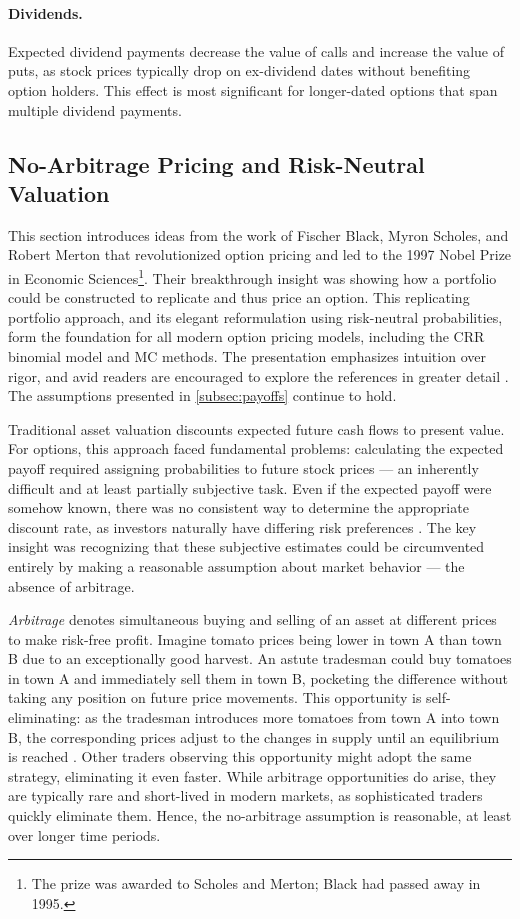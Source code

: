 \documentclass[english,12pt,a4paper,pdftex,sci,utf8]{aaltothesis}
\begin{document}
\paragraph{Dividends.} Expected dividend payments decrease the value of calls and increase the value of puts, as stock prices typically drop on ex-dividend dates without benefiting option holders. This effect is most significant for longer-dated options that span multiple dividend payments.
\clearpage


\subsection{No-Arbitrage Pricing and Risk-Neutral Valuation}\label{sec:risk-neutral-theory}

This section introduces ideas from the work of Fischer Black, Myron Scholes, and Robert Merton that revolutionized option pricing and led to the 1997 Nobel Prize in Economic Sciences\footnote{The prize was awarded to Scholes and Merton; Black had passed away in 1995.}. Their breakthrough insight was showing how a portfolio could be constructed to replicate and thus price an option. This replicating portfolio approach, and its elegant reformulation using risk-neutral probabilities, form the foundation for all modern option pricing models, including the CRR binomial model and MC methods. The presentation emphasizes intuition over rigor, and avid readers are encouraged to explore the references in greater detail \cite{hull2016options, gisiger2010risk, tham2001risk}. The assumptions presented in \cref{subsec:payoffs} continue to hold.

Traditional asset valuation discounts expected future cash flows to present value. For options, this approach faced fundamental problems: calculating the expected payoff required assigning probabilities to future stock prices --- an inherently difficult and at least partially subjective task. Even if the expected payoff were somehow known, there was no consistent way to determine the appropriate discount rate, as investors naturally have differing risk preferences \cite{nobel1997}. The key insight was recognizing that these subjective estimates could be circumvented entirely by making a reasonable assumption about market behavior --- the absence of arbitrage.

\emph{Arbitrage} denotes simultaneous buying and selling of an asset at different prices to make risk-free profit. Imagine tomato prices being lower in town A than town B due to an exceptionally good harvest. An astute tradesman could buy tomatoes in town A and immediately sell them in town B, pocketing the difference without taking any position on future price movements. This opportunity is self-eliminating: as the tradesman introduces more tomatoes from town A into town B, the corresponding prices adjust to the changes in supply until an equilibrium is reached \cite{hull2016options, wilmott2013paul}. Other traders observing this opportunity might adopt the same strategy, eliminating it even faster. While arbitrage opportunities do arise, they are typically rare and short-lived in modern markets, as sophisticated traders quickly eliminate them. Hence, the no-arbitrage assumption is reasonable, at least over longer time periods.
\end{document}

